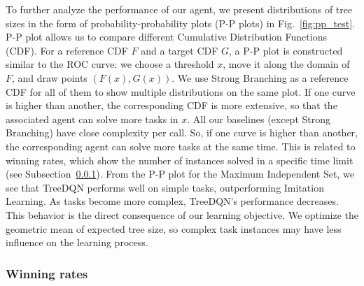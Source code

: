 \documentclass[preprint,12pt]{elsarticle} %
\theoremstyle{plain}
\theoremstyle{definition}
\theoremstyle{remark}
\begin{document}
To further analyze the performance of our agent, we present distributions of tree sizes in the form of probability-probability plots (P-P plots) in Fig.~\ref{fig:pp_test}. P-P plot allows us to compare different Cumulative Distribution Functions (CDF). For a reference CDF $F$ and a target CDF $G$, a P-P plot is constructed similar to the ROC curve: we choose a threshold $x$, move it along the domain of $F$, and draw points $(F(x), G(x))$. We use Strong Branching as a reference CDF for all of them to show multiple distributions on the same plot. If one curve is higher than another, the corresponding CDF is more extensive, so that the associated agent can solve more tasks in $x$. All our baselines (except Strong Branching) have close complexity per call. So, if one curve is higher than another, the corresponding agent can solve more tasks at the same time. This is related to winning rates, which show the number of instances solved in a specific time limit (see Subsection~\ref{sec:wr}). From the P-P plot for the Maximum Independent Set, we see that TreeDQN performs well on simple tasks, outperforming Imitation Learning. As tasks become more complex, TreeDQN's performance decreases. This behavior is the direct consequence of our learning objective. We optimize the geometric mean of expected tree size, so complex task instances may have less influence on the learning process.


\subsubsection{Winning rates}\label{sec:wr}
\end{document}
